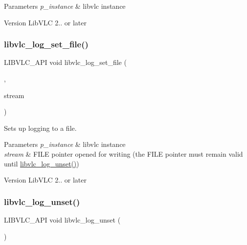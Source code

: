 \begin{DoxyParams}{Parameters}
{\em p\+\_\+instance} & libvlc instance \\
\hline
\end{DoxyParams}
\begin{DoxyVersion}{Version}
Lib\+V\+LC 2.. or later 
\end{DoxyVersion}
\mbox{\label{group__libvlc__log_ga0dbaa5502842d6d4b33469b8c25deec9}} 
\subsubsection{\texorpdfstring{libvlc\+\_\+log\+\_\+set\+\_\+file()}{libvlc\_log\_set\_file()}}
{\footnotesize\ttfamily L\+I\+B\+V\+L\+C\+\_\+\+A\+PI void libvlc\+\_\+log\+\_\+set\+\_\+file (\begin{DoxyParamCaption}\item[{\hyperlink{group__libvlc__core_ga316d739a80da4678206c79f4d6c2e284}{libvlc\+\_\+instance\+\_\+t} $\ast$}]{,  }\item[{F\+I\+LE $\ast$}]{stream }\end{DoxyParamCaption})}

Sets up logging to a file. 
\begin{DoxyParams}{Parameters}
{\em p\+\_\+instance} & libvlc instance \\
\hline
{\em stream} & F\+I\+LE pointer opened for writing (the F\+I\+LE pointer must remain valid until \hyperlink{group__libvlc__log_ga464c81cbb884ea176ac8c39d50080b17}{libvlc\+\_\+log\+\_\+unset()}) \\
\hline
\end{DoxyParams}
\begin{DoxyVersion}{Version}
Lib\+V\+LC 2.. or later 
\end{DoxyVersion}
\mbox{\label{group__libvlc__log_ga464c81cbb884ea176ac8c39d50080b17}} 
\subsubsection{\texorpdfstring{libvlc\+\_\+log\+\_\+unset()}{libvlc\_log\_unset()}}
{\footnotesize\ttfamily L\+I\+B\+V\+L\+C\+\_\+\+A\+PI void libvlc\+\_\+log\+\_\+unset (\begin{DoxyParamCaption}\item[{\hyperlink{group__libvlc__core_ga316d739a80da4678206c79f4d6c2e284}{libvlc\+\_\+instance\+\_\+t} $\ast$}]{ }\end{DoxyParamCaption})}

